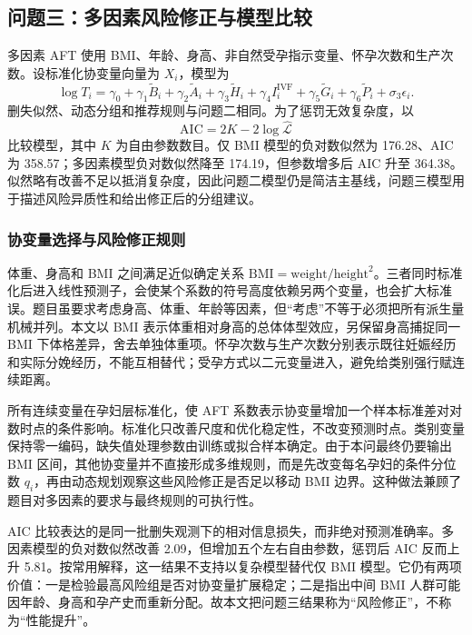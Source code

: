 \documentclass[UTF8,a4paper,12pt]{ctexart}
\begin{document}
\subsection{问题三：多因素风险修正与模型比较}

多因素 AFT 使用 BMI、年龄、身高、非自然受孕指示变量、怀孕次数和生产次数。设标准化协变量向量为 $X_i$，模型为
\begin{equation}
\log T_i=\gamma_0+\gamma_1\widetilde B_i+\gamma_2\widetilde A_i+\gamma_3\widetilde H_i+
\gamma_4 I_i^{\mathrm{IVF}}+\gamma_5\widetilde G_i+\gamma_6\widetilde P_i+\sigma_3\epsilon_i.
\label{eq:aftmulti}
\end{equation}
删失似然、动态分组和推荐规则与问题二相同。为了惩罚无效复杂度，以
\begin{equation}
\mathrm{AIC}=2K-2\log\widehat{\mathcal L}
\label{eq:aic}
\end{equation}
比较模型，其中 $K$ 为自由参数数目。仅 BMI 模型的负对数似然为 176.28、AIC 为 358.57；多因素模型负对数似然降至 174.19，但参数增多后 AIC 升至 364.38。似然略有改善不足以抵消复杂度，因此问题二模型仍是简洁主基线，问题三模型用于描述风险异质性和给出修正后的分组建议。

\subsubsection{协变量选择与风险修正规则}

体重、身高和 BMI 之间满足近似确定关系 $\mathrm{BMI}=\mathrm{weight}/\mathrm{height}^2$。三者同时标准化后进入线性预测子，会使某个系数的符号高度依赖另两个变量，也会扩大标准误。题目虽要求考虑身高、体重、年龄等因素，但“考虑”不等于必须把所有派生量机械并列。本文以 BMI 表示体重相对身高的总体体型效应，另保留身高捕捉同一 BMI 下体格差异，舍去单独体重项。怀孕次数与生产次数分别表示既往妊娠经历和实际分娩经历，不能互相替代；受孕方式以二元变量进入，避免给类别强行赋连续距离。

所有连续变量在孕妇层标准化，使 AFT 系数表示协变量增加一个样本标准差对对数时点的条件影响。标准化只改善尺度和优化稳定性，不改变预测时点。类别变量保持零一编码，缺失值处理参数由训练或拟合样本确定。由于本问最终仍要输出 BMI 区间，其他协变量并不直接形成多维规则，而是先改变每名孕妇的条件分位数 $q_i$，再由动态规划观察这些风险修正是否足以移动 BMI 边界。这种做法兼顾了题目对多因素的要求与最终规则的可执行性。

AIC 比较表达的是同一批删失观测下的相对信息损失，而非绝对预测准确率。多因素模型的负对数似然改善 2.09，但增加五个左右自由参数，惩罚后 AIC 反而上升 5.81。按常用解释，这一结果不支持以复杂模型替代仅 BMI 模型。它仍有两项价值：一是检验最高风险组是否对协变量扩展稳定；二是指出中间 BMI 人群可能因年龄、身高和孕产史而重新分配。故本文把问题三结果称为“风险修正”，不称为“性能提升”。
\end{document}
